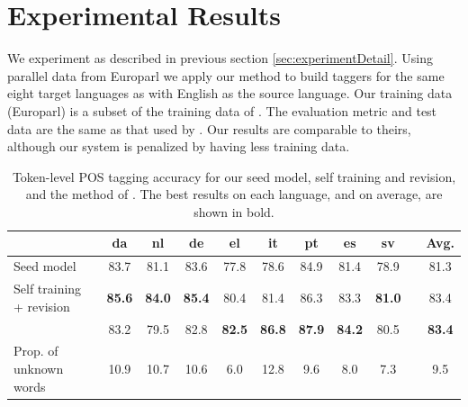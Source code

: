 
\section{Experimental Results}
We experiment as described in previous section \ref{sec:experimentDetail}. 
Using parallel data from Europarl \cite{europarl} we apply our method
to build taggers for the same eight target languages as
\cite{Das:2011} with English as the source language.  Our
training data (Europarl) is a subset of the training data of
. The evaluation metric and test data
are the same as that used by \citeauthor{Das:2011}. Our results are
comparable to theirs, although our system is penalized by having less
training data. 

\begin{table}
\small
\tabcolsep 5pt
\begin{center}
\begin{tabular}{lcccccccccc}
        \hline
        ~                      & da & nl & de & el & it & pt & es & sv & & Avg. \\ \hline
        Seed model             & 83.7   & 81.1  & 83.6   & 77.8 & 78.6    & 84.9       & 81.4       & 78.9    & & 81.3   \\ 
        Self training + revision & \textbf{85.6}  & \textbf{84.0}    & \textbf{85.4}   & 80.4  & 81.4   & 86.3       &   83.3     & \textbf{81.0}      & & 83.4   \\ 
        \cite{Das:2011}          & 83.2   & 79.5  & 82.8   & \textbf{82.5}  & \textbf{86.8}    & \textbf{87.9}       & \textbf{84.2}    & 80.5    & & \textbf{83.4}   \\ 
\hline
Prop. of unknown words  & 10.9   & 10.7 & 10.6      & 6.0     & 12.8    & 9.6       & 8.0        & 7.3    & & 9.5   \\
\end{tabular}
\caption{Token-level POS tagging accuracy for our seed model, self
  training and revision, and the method of \protect\cite{Das:2011}. The best results on each language, and on average, are shown in bold. }
\label{tab:taggingAcc}
\end{center}
\end{table}


